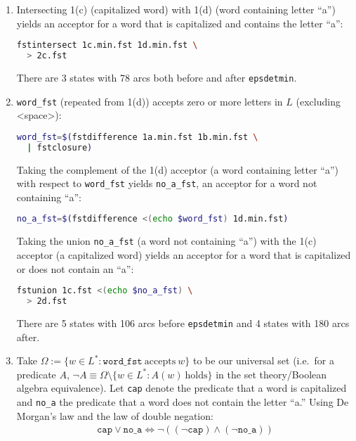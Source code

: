 \documentclass[a4paper,oneside,reqno]{amsart}
\begin{document}
\begin{enumerate}[label=\arabic*.]
\begin{enumerate}[label=(\alph*)]
      \item Intersecting 1(c) (capitalized word) with 1(d) (word containing
        letter ``a'') yields an acceptor for a word that is capitalized and
        contains the letter ``a'':
        \begin{lstlisting}[language=bash]
fstintersect 1c.min.fst 1d.min.fst \
  > 2c.fst
        \end{lstlisting}
        There are 3 states with 78 arcs both before and after \texttt{epsdetmin}.

      \item \texttt{word\_fst} (repeated from 1(d)) accepts zero or more
        letters in $L$ (excluding <space>):
        \begin{lstlisting}[language=bash]
word_fst=$(fstdifference 1a.min.fst 1b.min.fst \
  | fstclosure)
        \end{lstlisting}

        Taking the complement of the 1(d) acceptor (a word containing letter
        ``a'') with respect to \texttt{word\_fst} yields \texttt{no\_a\_fst},
        an acceptor for a word not containing ``a'':
        \begin{lstlisting}[language=bash]
no_a_fst=$(fstdifference <(echo $word_fst) 1d.min.fst)
        \end{lstlisting}

        Taking the union \texttt{no\_a\_fst} (a word not containing ``a'') with
        the 1(c) acceptor (a capitalized word) yields an acceptor for
        a word that is capitalized or does not contain an ``a'':
        \begin{lstlisting}[language=bash]
fstunion 1c.fst <(echo $no_a_fst) \
  > 2d.fst
        \end{lstlisting}
        There are 5 states with 106 arcs before \texttt{epsdetmin} and 4
        states with 180 arcs after.

      \item Take $\Omega := \{ w \in L^* :
        \texttt{word\_fst}~\text{accepts}~w\}$ to be our universal set (i.e.\
        for a predicate $A$, $\lnot A \equiv \Omega \setminus \{w \in L^*:
        A(w)~\text{holds}\}$ in the set theory/Boolean algebra equivalence).
        Let \texttt{cap} denote the predicate that a word is capitalized and
        \texttt{no\_a} the predicate that a word does not contain the letter
        ``a.'' Using De Morgan's law and the law of double negation:
        \begin{align}
          \texttt{cap} \lor \texttt{no\_a} \iff
          \lnot ((\lnot \texttt{cap}) \land (\lnot \texttt{no\_a}))
        \end{align}


\end{enumerate}
\end{enumerate}
\end{document}
